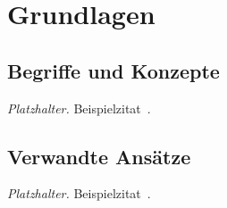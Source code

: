\section{Grundlagen}
\label{sec:grundlagen}


\subsection{Begriffe und Konzepte}
\label{sec:begriffe}

\textit{Platzhalter.} Beispielzitat~\cite{platzhalter-buch}.

\subsection{Verwandte Ansätze}
\label{sec:verwandte}

\textit{Platzhalter.} Beispielzitat~\cite{platzhalter-online}.
